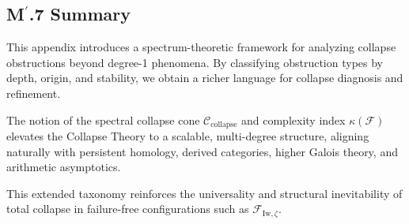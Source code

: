 \documentclass[11pt]{article}
\begin{document}
\subsection*{M$^\prime$.7 Summary}

This appendix introduces a spectrum-theoretic framework for analyzing collapse obstructions beyond degree-1 phenomena. By classifying obstruction types by depth, origin, and stability, we obtain a richer language for collapse diagnosis and refinement.

The notion of the spectral collapse cone $\mathcal{C}_{\mathrm{collapse}}$ and complexity index $\kappa(\mathcal{F})$ elevates the Collapse Theory to a scalable, multi-degree structure, aligning naturally with persistent homology, derived categories, higher Galois theory, and arithmetic asymptotics.

This extended taxonomy reinforces the universality and structural inevitability of total collapse in failure-free configurations such as $\mathcal{F}_{\mathrm{Iw}, \zeta}$.
\end{document}
